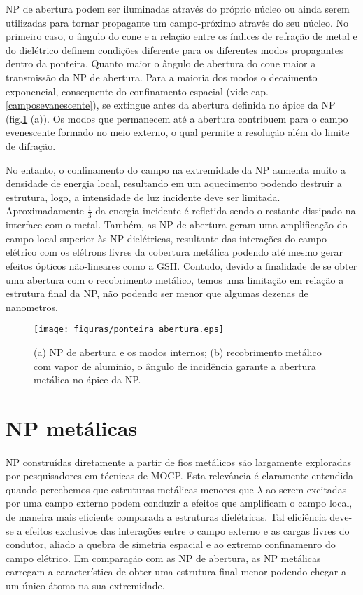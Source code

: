 NP de abertura podem ser iluminadas através do próprio núcleo ou ainda serem utilizadas para tornar propagante um campo-próximo através do seu núcleo. No primeiro caso, o ângulo do cone e a relação entre os índices de refração de metal e do dielétrico definem condições diferente para os diferentes modos propagantes dentro da ponteira. Quanto maior o ângulo de abertura do cone maior a transmissão da NP de abertura. Para a maioria dos modos o decaimento exponencial, consequente do confinamento espacial (vide cap.\ref{camposevanescente}), se extingue antes da abertura definida no ápice da NP (fig.\ref{fig:abertura} (a)). Os modos que permanecem até a abertura contribuem para o campo evenescente formado no meio externo, o qual permite a resolução além do limite de difração.

No entanto, o confinamento do campo na extremidade da NP aumenta muito a densidade de energia local, resultando em um aquecimento podendo destruir a estrutura, logo, a intensidade de luz incidente deve ser limitada. Aproximadamente $\frac{1}{3}$ da energia incidente é refletida sendo o restante dissipado na interface com o metal. Também, as NP de abertura geram uma amplificação do campo local superior às NP dielétricas, resultante das interações do campo elétrico com os elétrons livres da cobertura metálica podendo até mesmo gerar efeitos ópticos não-lineares como a GSH. Contudo, devido a finalidade de se obter uma abertura com o recobrimento metálico, temos uma limitação em relação a estrutura final da NP, não podendo ser menor que algumas dezenas de nanometros.

\begin{figure}[h]
\centering
\texttt{[image: figuras/ponteira\_abertura.eps]}
\caption{(a) NP de abertura e os modos internos; (b) recobrimento metálico com vapor de aluminio, o ângulo de incidência garante a abertura metálica no ápice da NP.  \cite{principle}}
\label{fig:abertura}
\end{figure} 

\section{NP metálicas}
\paragraph*{}
NP construídas diretamente a partir de fios metálicos são largamente exploradas por pesquisadores em técnicas de MOCP. Esta relevância é claramente entendida quando percebemos que estruturas metálicas menores que $\lambda$ ao  serem excitadas por uma campo externo podem conduzir a efeitos que amplificam o campo local, de maneira mais eficiente comparada a estruturas dielétricas. Tal eficiência deve-se a efeitos exclusivos das interações entre o campo externo e as cargas livres do condutor, aliado a quebra de simetria espacial e ao extremo confinamenro do campo elétrico. Em comparação com as NP de abertura, as NP metálicas carregam a característica de obter uma estrutura final menor podendo chegar a um único átomo na sua extremidade. 

